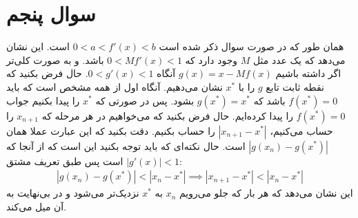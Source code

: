 \documentclass[]{article}
\begin{document}
\section*{سوال پنجم}
همان طور که در صورت سوال ذکر شده است
$0 < a < f'(x) < b$
است. این نشان می‌دهد که یک عدد مثل
$M$
وجود دارد که
$0 < Mf'(x) < 1$
باشد. و به صورت کلی‌تر اگر داشته باشیم
$g(x) = x - Mf(x)$
آنگاه
$0 < g'(x) < 1$.
حال فرض بکنید که نقطه ثابت تابع
$g$
را با
$x^*$
نشان می‌دهیم. آنگاه اول از همه مشخص است که باید
$f(x^*) = 0$
باشد که
$g(x^*) = x^*$
بشود. پس در صورتی که
$x^*$
را پیدا بکنیم جواب
$f(x^*) = 0$
را پیدا کرده‌ایم. حال فرض بکنید که 
می‌خواهیم در هر مرحله که
$x_{n+1}$
را حساب می‌کنیم،
$|x_{n+1} - x^*|$
را حساب بکنیم. دقت بکنید که این عبارت عملا همان
$|g(x_n) - g(x^*)|$
است. حال نکته‌ای که باید توجه بکنید این است که از آنجا که
$|g'(x)| < 1$
است پس طبق تعریف مشتق:
\begin{gather*}
    |g(x_n) - g(x^*)| < |x_n - x^*| \implies |x_{n+1} - x^*| < |x_n - x^*|
\end{gather*}
این نشان می‌دهد که هر بار که جلو می‌رویم
$x_n$ به $x^*$
نزدیک‌تر می‌شود و در بی‌نهایت به آن میل می‌کند.
\end{document}
